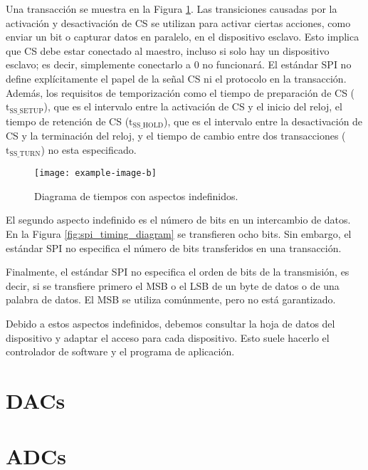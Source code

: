     Una transacción se muestra en la Figura \ref{fig:spi_timing_diagram_aspects}. Las transiciones causadas por la activación y desactivación de CS se utilizan para activar ciertas acciones, como enviar un bit o capturar datos en paralelo, en el dispositivo esclavo. Esto implica que CS debe estar conectado al maestro, incluso si solo hay un dispositivo esclavo; es decir, simplemente conectarlo a 0 no funcionará. El estándar SPI no define explícitamente el papel de la señal CS ni el protocolo en la transacción. Además, los requisitos de temporización como el tiempo de preparación de CS ($\text{t}_{\text{SS\_SETUP}}$), que es el intervalo entre la activación de CS y el inicio del reloj, el tiempo de retención de CS ($\text{t}_{\text{SS\_HOLD}}$), que es el intervalo entre la desactivación de CS y la terminación del reloj, y el tiempo de cambio entre dos transacciones ($\text{t}_{\text{SS\_TURN}}$) no esta especificado.

    \begin{figure}[hbtp]
      \centering
      \texttt{[image: example-image-b]}
      \caption{Diagrama de tiempos con aspectos indefinidos.}
      \label{fig:spi_timing_diagram_aspects}
    \end{figure}

    El segundo aspecto indefinido es el número de bits en un intercambio de datos. En la Figura \ref{fig:spi_timing_diagram} se transfieren ocho bits. Sin embargo, el estándar SPI no especifica el número de bits transferidos en una transacción.

    Finalmente, el estándar SPI no especifica el orden de bits de la transmisión, es decir, si se transfiere primero el MSB o el LSB de un byte de datos o de una palabra de datos. El MSB se utiliza comúnmente, pero no está garantizado.

    Debido a estos aspectos indefinidos, debemos consultar la hoja de datos del dispositivo y adaptar el acceso para cada dispositivo. Esto suele hacerlo el controlador de software y el programa de aplicación.





	
	\section{DACs}

	\section{ADCs}
	
